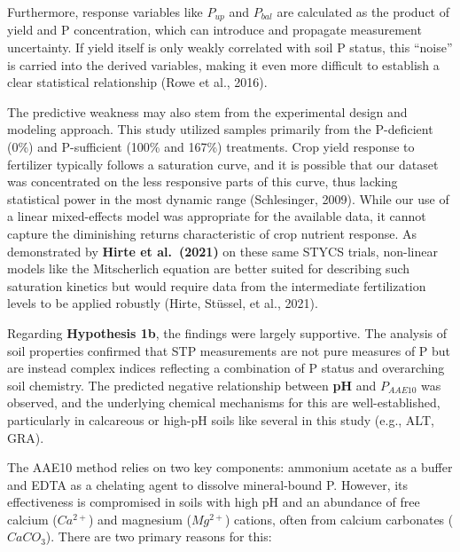 \documentclass[
  a4paper,
]{article}
\begin{document}
Furthermore, response variables like \(P_{up}\) and \(P_{bal}\) are
calculated as the product of yield and P concentration, which can
introduce and propagate measurement uncertainty. If yield itself is only
weakly correlated with soil P status, this ``noise'' is carried into the
derived variables, making it even more difficult to establish a clear
statistical relationship (Rowe et al., 2016).

The predictive weakness may also stem from the experimental design and
modeling approach. This study utilized samples primarily from the
P-deficient (0\%) and P-sufficient (100\% and 167\%) treatments. Crop
yield response to fertilizer typically follows a saturation curve, and
it is possible that our dataset was concentrated on the less responsive
parts of this curve, thus lacking statistical power in the most dynamic
range (Schlesinger, 2009). While our use of a linear mixed-effects model
was appropriate for the available data, it cannot capture the
diminishing returns characteristic of crop nutrient response. As
demonstrated by \textbf{Hirte et al.~(2021)} on these same STYCS trials,
non-linear models like the Mitscherlich equation are better suited for
describing such saturation kinetics but would require data from the
intermediate fertilization levels to be applied robustly (Hirte,
Stüssel, et al., 2021).

Regarding \textbf{Hypothesis 1b}, the findings were largely supportive.
The analysis of soil properties confirmed that STP measurements are not
pure measures of P but are instead complex indices reflecting a
combination of P status and overarching soil chemistry. The predicted
negative relationship between \textbf{pH} and \textbf{\(P_{AAE10}\)} was
observed, and the underlying chemical mechanisms for this are
well-established, particularly in calcareous or high-pH soils like
several in this study (e.g., ALT, GRA).

The AAE10 method relies on two key components: ammonium acetate as a
buffer and EDTA as a chelating agent to dissolve mineral-bound P.
However, its effectiveness is compromised in soils with high pH and an
abundance of free calcium (\(Ca^{2+}\)) and magnesium (\(Mg^{2+}\))
cations, often from calcium carbonates (\(CaCO_3\)). There are two
primary reasons for this:
\end{document}
